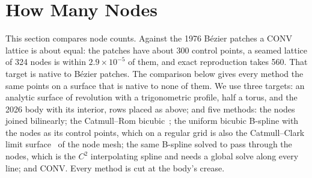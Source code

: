 \documentclass[journal]{IEEEtran}
\begin{document}
\section{How Many Nodes}
\label{sec:budget}

This section compares node counts. Against the 1976 B\'ezier patches a
CONV lattice is about equal: the patches have about 300 control points,
a seamed lattice of 324 nodes is within $2.9\times10^{-5}$ of them, and
exact reproduction takes 560. That target is native to B\'ezier
patches. The comparison below gives every method the same points on a
surface that is native to none of them. We use three targets: an analytic surface of
revolution with a trigonometric profile, half a torus, and the 2026 body
with its interior, rows placed as above; and five methods: the nodes
joined bilinearly; the Catmull--Rom bicubic~\cite{catmullrom1974}; the
uniform bicubic B-spline with the nodes as its control points, which on
a regular grid is also the Catmull--Clark limit
surface~\cite{catmullclark1978} of the node mesh; the same B-spline
solved to pass through the nodes, which is the $C^2$ interpolating
spline and needs a global solve along every line; and CONV. Every method
is cut at the body's crease.
\end{document}
